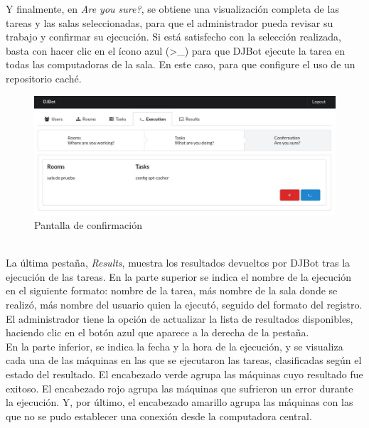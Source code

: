 \documentclass[a4paper,12pt]{article}
\begin{document}
Y finalmente, en \emph{Are you sure?}, se obtiene una visualización completa de las tareas y las salas seleccionadas, para que el administrador pueda revisar su trabajo y confirmar su ejecución. Si está satisfecho con la selección realizada, basta con hacer clic en el ícono azul (>\_) para que DJBot ejecute la tarea en todas las computadoras de la sala. En este caso, para que configure el uso de un repositorio caché.\\

\begin{figure}[htb]
\centering
\includegraphics[width=.9\linewidth]{./img/confirmacion.jpg}
\caption{Pantalla de confirmación}
\end{figure} \\


La última pestaña, \emph{Results}, muestra los resultados devueltos por DJBot tras la ejecución de las tareas. En la parte superior se indica el nombre de la ejecución en el siguiente formato: nombre de la tarea, más nombre de la sala donde se realizó, más nombre del usuario quien la ejecutó, seguido del formato del registro. El administrador tiene la opción de actualizar la lista de resultados disponibles, haciendo clic en el botón azul que aparece a la derecha de la pestaña.\\

En la parte inferior, se indica la fecha y la hora de la ejecución, y se visualiza cada una de las máquinas en las que se ejecutaron las tareas, clasificadas según el estado del resultado. El encabezado verde agrupa las máquinas cuyo resultado fue exitoso. El encabezado rojo agrupa las máquinas que sufrieron un error durante la ejecución. Y, por último, el encabezado amarillo agrupa las máquinas con las que no se pudo establecer una conexión desde la computadora central.\\
\end{document}
